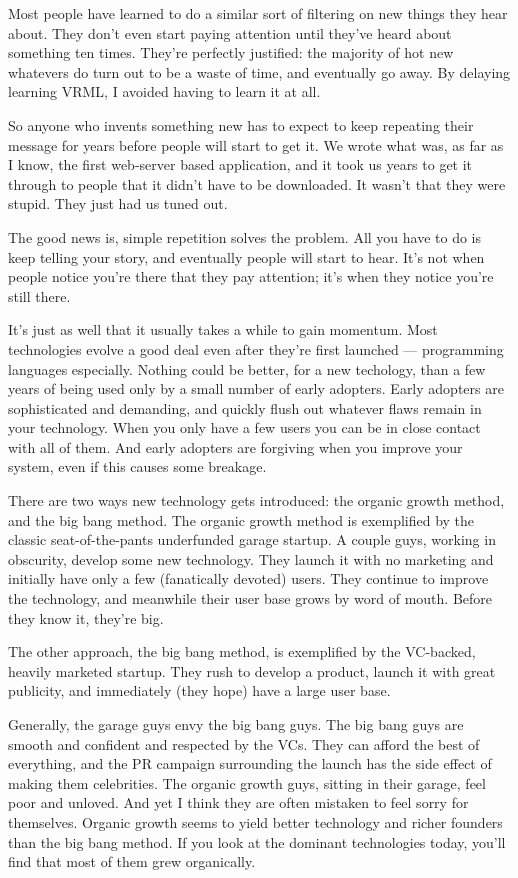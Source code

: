 \documentclass[12pt]{book}
\begin{document}
Most people have learned to do a similar sort of filtering on new things
they hear about. They don't even start paying attention until they've
heard about something ten times. They're perfectly justified: the
majority of hot new whatevers do turn out to be a waste of time, and
eventually go away. By delaying learning VRML, I avoided having to learn
it at all.

So anyone who invents something new has to expect to keep repeating
their message for years before people will start to get it. We wrote
what was, as far as I know, the first web-server based application, and
it took us years to get it through to people that it didn't have to be
downloaded. It wasn't that they were stupid. They just had us tuned out.

The good news is, simple repetition solves the problem. All you have to
do is keep telling your story, and eventually people will start to hear.
It's not when people notice you're there that they pay attention; it's
when they notice you're still there.

It's just as well that it usually takes a while to gain momentum. Most
technologies evolve a good deal even after they're first launched ---
programming languages especially. Nothing could be better, for a new
techology, than a few years of being used only by a small number of
early adopters. Early adopters are sophisticated and demanding, and
quickly flush out whatever flaws remain in your technology. When you
only have a few users you can be in close contact with all of them. And
early adopters are forgiving when you improve your system, even if this
causes some breakage.

There are two ways new technology gets introduced: the organic growth
method, and the big bang method. The organic growth method is
exemplified by the classic seat-of-the-pants underfunded garage startup.
A couple guys, working in obscurity, develop some new technology. They
launch it with no marketing and initially have only a few (fanatically
devoted) users. They continue to improve the technology, and meanwhile
their user base grows by word of mouth. Before they know it, they're
big.

The other approach, the big bang method, is exemplified by the
VC-backed, heavily marketed startup. They rush to develop a product,
launch it with great publicity, and immediately (they hope) have a large
user base.

Generally, the garage guys envy the big bang guys. The big bang guys are
smooth and confident and respected by the VCs. They can afford the best
of everything, and the PR campaign surrounding the launch has the side
effect of making them celebrities. The organic growth guys, sitting in
their garage, feel poor and unloved. And yet I think they are often
mistaken to feel sorry for themselves. Organic growth seems to yield
better technology and richer founders than the big bang method. If you
look at the dominant technologies today, you'll find that most of them
grew organically.
\end{document}
